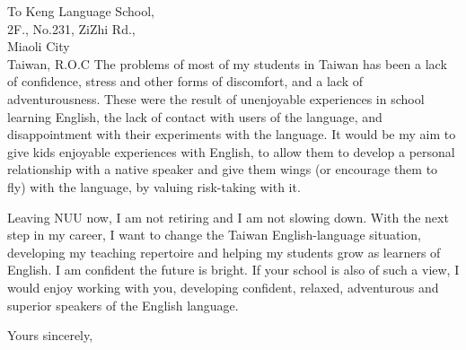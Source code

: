 \documentclass{letter}
\begin{document}
\begin{letter}{
To Keng Language School,\\ 2F., No.231, ZiZhi Rd.,\\ Miaoli City\\ Taiwan, R.O.C}
The problems of most of my students in Taiwan has been a lack of confidence, stress and other forms of discomfort, and a lack of adventurousness. These were the result of unenjoyable experiences in school learning English, the lack of contact with users of the language, and disappointment with their experiments with the language. It would be my aim to give kids enjoyable experiences with English, to allow them to develop a personal relationship with a native speaker and give them wings (or encourage them to fly) with the language, by valuing risk-taking with it. 

Leaving NUU now, I am not retiring and I am not slowing down. With the next step in my career, I want to change the Taiwan English-language situation, developing my teaching repertoire and helping my students grow as learners of English. I am confident the future is bright. If your school is also of such a view, I would enjoy working with you, developing confident, relaxed, adventurous and superior speakers of the English language.

\closing{Yours sincerely,}


\end{letter}
\end{document}
